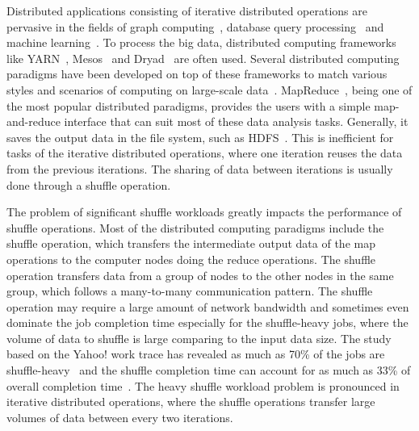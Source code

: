 \documentclass[10pt,journal,compsoc]{IEEEtran}
\begin{document}


Distributed applications consisting of iterative distributed operations are pervasive in the fields of graph computing~\cite{Malewicz:2010:PSL, Lu:2014:LDG}, database query processing~\cite{thusoo2009hive,Yu:2008:DSG,Armbrust:2015:SSR} and machine learning~\cite{low2012distributed,kraska2013mlbase}.
To process the big data,
distributed computing frameworks like YARN~\cite{vavilapalli2013apache},
Mesos~\cite{hindman2011mesos} and Dryad~\cite{isard2007dryad} are often used.
Several distributed computing paradigms have been developed on top of
these frameworks to match various styles and
scenarios of computing on large-scale data~\cite{thusoo2009hive, Yu:2008:DSG}.
MapReduce~\cite{dean2008mapreduce}, being one of the most popular
distributed paradigms, provides the users with a simple map-and-reduce
interface that can suit most of these data analysis tasks.
Generally, it saves the output data in the file system, such as HDFS~\cite{shvachko2010hadoop}. 
This is inefficient for tasks of the iterative distributed operations, where one iteration reuses the data from the previous iterations. The sharing of data between iterations is usually done
through a shuffle operation.

The problem of significant shuffle workloads greatly impacts the performance of shuffle operations. 
Most of the distributed computing paradigms include the shuffle
operation, which transfers the intermediate output data of the map
operations to the computer nodes doing the reduce operations.
The shuffle operation transfers data from a group of nodes to the other
nodes in the same group, which follows a many-to-many communication
pattern.
The shuffle operation may require a large amount of network bandwidth
and sometimes even dominate the job completion time especially for the
shuffle-heavy jobs, where the volume of data to shuffle is large
comparing to the input data size.
The study based on the Yahoo! work trace has revealed as much as 70\% of the
jobs are shuffle-heavy~\cite{chen2011case} and the shuffle completion
time can account for as much as 33\% of overall completion time~\cite{chowdhury2011managing, al2010hedera}.
The heavy shuffle workload problem is pronounced in iterative distributed operations, 
where the shuffle operations transfer large volumes of data between every two iterations. 
\end{document}
